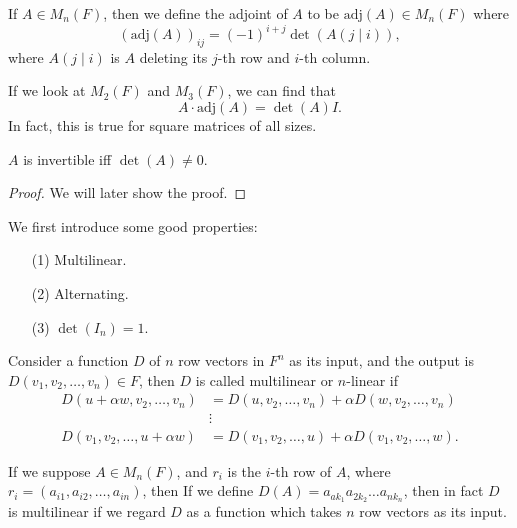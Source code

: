 \begin{definition}
    If \(A \in M_n(F)\), then we define the adjoint of \(A\) to be \(\mathrm{adj}(A) \in M_n(F) \) where 
    \[
      \left( \mathrm{adj}(A)  \right)_{ij} = (-1)^{i+j} \det \left( A \left( j \mid i \right)  \right),    
    \]  where \(A\left( j \mid i \right) \) is \(A\) deleting its \(j\)-th row and \(i\)-th column.   
\end{definition}
 
\begin{note}
    If we look at \(M_2(F)\) and \(M_3(F)\), we can find that 
    \[
        A \cdot \mathrm{adj}(A) = \det (A) I.
    \]  
    In fact, this is true for square matrices of all sizes.
\end{note}

\begin{remark} \label{rmk: A invertible iff det A neq 0}
    \(A\) is invertible iff \(\det (A) \neq 0\).  
\end{remark}
\begin{proof}
    We will later show the proof.
\end{proof}

We first introduce some good properties:
\begin{itemize}
    \item [(1)] Multilinear. 
    \item [(2)] Alternating. 
    \item [(3)] \(\det (I_n) = 1\). 
\end{itemize}

\begin{definition}[Multilinear]
    Consider a function \(D\) of \(n\) row vectors in \(F^n\) as its input, and the output is \(D(v_1, v_2, \dots , v_n) \in F\), then \(D\) is called multilinear or \(n\)-linear if 
    \begin{align*}
        D(u + \alpha w, v_2, \dots , v_n) &= D(u, v_2, \dots , v_n) + \alpha D(w, v_2, \dots , v_n) \\
        &\vdots \\
        D(v_1, v_2, \dots , u + \alpha w) &= D(v_1, v_2, \dots , u) + \alpha D(v_1, v_2, \dots , w).
    \end{align*}      
\end{definition}
\begin{eg}
    If we suppose \(A \in M_n(F)\), and \(r_i\) is the \(i\)-th row of \(A\), where \(r_i = (a_{i1}, a_{i2}, \dots , a_{in} )\), then If we define \(D(A) = a_{a k_1} a_{2 k_2} \dots a_{n k_n}\), then in fact \(D\) is multilinear if we regard \(D\) as a function which takes \(n\) row vectors as its input.         
\end{eg}

